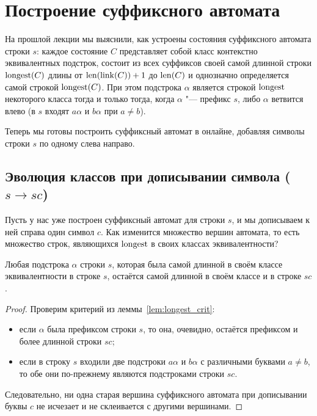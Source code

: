 \section{Построение суффиксного автомата}

На прошлой лекции мы выяснили, как устроены состояния суффиксного автомата строки $s$: каждое состояние $C$ представляет собой класс контекстно эквивалентных подстрок, состоит из всех суффиксов своей самой длинной строки $\operatorname{longest}(C)$ длины от $\operatorname{len}(\operatorname{link}(C)) + 1$ до $\operatorname{len}(C)$ и однозначно определяется самой строкой $\operatorname{longest}(C)$. При этом подстрока $\alpha$ является строкой $\operatorname{longest}$ некоторого класса тогда и только тогда, когда $\alpha$ "--- префикс $s$, либо $\alpha$ ветвится влево (в $s$ входят $a\alpha$ и $b\alpha$ при $a \ne b$).

Теперь мы готовы построить суффиксный автомат в онлайне, добавляя символы строки $s$ по одному слева направо.

\subsection{Эволюция классов при дописывании символа \texorpdfstring{($s \to sc$)}{(s -> sc)}}

Пусть у нас уже построен суффиксный автомат для строки $s$, и мы дописываем к ней справа один символ $c$. Как изменится множество вершин автомата, то есть множество строк, являющихся $\operatorname{longest}$ в своих классах эквивалентности?

\begin{proposition}
    Любая подстрока $\alpha$ строки $s$, которая была самой длинной в своём классе эквивалентности в строке $s$, остаётся самой длинной в своём классе и в строке $sc$.
\end{proposition}

\begin{proof}
    Проверим критерий из леммы~\ref{lem:longest_crit}:
    \begin{itemize}
        \item если $\alpha$ была префиксом строки $s$, то она, очевидно, остаётся префиксом и более длинной строки $sc$;
        \item если в строку $s$ входили две подстроки $a\alpha$ и $b\alpha$ с различными буквами $a \ne b$, то обе они по-прежнему являются подстроками строки $sc$.
    \end{itemize}
    Следовательно, ни одна старая вершина суффиксного автомата при дописывании буквы $c$ не исчезает и не склеивается с другими вершинами.
\end{proof}

